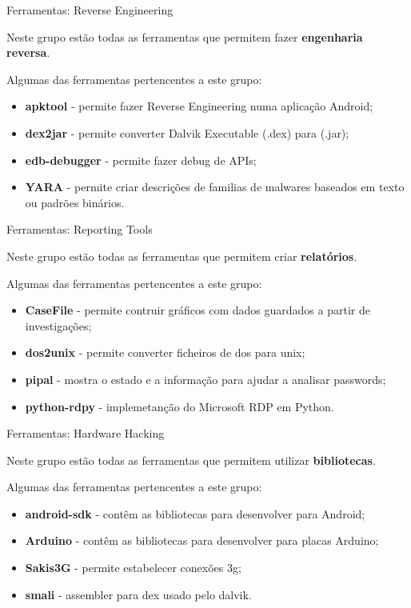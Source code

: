 \documentclass{beamer}
\begin{document}
\begin{frame}{Ferramentas: Reverse Engineering}

Neste grupo estão todas as ferramentas que permitem fazer \textbf{engenharia reversa}.

\hfill

Algumas das ferramentas pertencentes a este grupo:
    \begin{itemize}
        \item \textbf{apktool} - permite fazer Reverse Engineering numa aplicação Android;
        \item \textbf{dex2jar} - permite converter Dalvik Executable (.dex) para (.jar);
        \item \textbf{edb-debugger} - permite fazer debug de APIs;
        \item \textbf{YARA} - permite criar descrições de familias de malwares baseados em texto ou padrões binários.
    \end{itemize}
\end{frame}
\begin{frame}{Ferramentas: Reporting Tools}

Neste grupo estão todas as ferramentas que permitem criar \textbf{relatórios}.

\hfill

Algumas das ferramentas pertencentes a este grupo:
    \begin{itemize}
        \item \textbf{CaseFile} - permite contruir gráficos com dados guardados a partir de investigações;
        \item \textbf{dos2unix} - permite converter ficheiros de dos para unix;
        \item \textbf{pipal} - mostra o estado e a informação para ajudar a analisar passwords;
        \item \textbf{python-rdpy} - implemetanção do Microsoft RDP em Python.
    \end{itemize}
\end{frame}
\begin{frame}{Ferramentas: Hardware Hacking}

Neste grupo estão todas as ferramentas que permitem utilizar \textbf{bibliotecas}.

\hfill

Algumas das ferramentas pertencentes a este grupo:
    \begin{itemize}
        \item \textbf{android-sdk} - contêm as bibliotecas para desenvolver para Android;
        \item \textbf{Arduino} - contêm as bibliotecas para desenvolver para placas Arduino;
        \item \textbf{Sakis3G} - permite estabelecer conexões 3g;
        \item \textbf{smali} - assembler para dex usado pelo dalvik.
    \end{itemize}
\end{frame}
\end{document}
